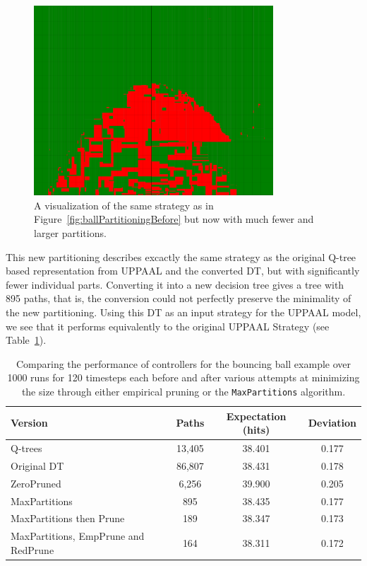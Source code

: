 \documentclass{article}
\begin{document}
\begin{figure}[h]
    \centering
    \includegraphics[width=0.8\textwidth]{ballPartitioningAfter}
    \caption{%
        A visualization of the same strategy as in
        Figure~\ref{fig:ballPartitioningBefore} but now with much fewer and
        larger partitions.
    }\label{fig:ballPartitioningAfter}
\end{figure}

This new partitioning describes excactly the same strategy as the original
Q-tree based representation from UPPAAL and the converted DT, but with
significantly fewer individual parts. Converting it into a new decision tree
gives a tree with 895 paths, that is, the conversion could not perfectly
preserve the minimality of the new partitioning. Using this DT as an input
strategy for the UPPAAL model, we see that it performs equivalently to the
original UPPAAL Strategy (see Table~\ref{tab:minimizedResults}).

\begin{table}[h!]
    \centering
    \caption{%
        Comparing the performance of controllers for the bouncing ball example
        over 1000 runs for 120 timesteps each before and after various attempts
        at minimizing the size through either empirical pruning or the
        \texttt{MaxPartitions} algorithm.
    }\label{tab:minimizedResults}
    \begin{tabular}[t]{lccc}
        \toprule
        Version & Paths & Expectation (hits) & Deviation \\
        \midrule
        Q-trees & 13,405 & 38.401 & 0.177 \\
        Original DT & 86,807 & 38.431 & 0.178 \\
        ZeroPruned & 6,256 & 39.900 & 0.205 \\
        MaxPartitions & 895 & 38.435 & 0.177 \\
        MaxPartitions then Prune & 189 & 38.347 & 0.173 \\
        MaxPartitions, EmpPrune and RedPrune & 164 & 38.311 & 0.172 \\
        \bottomrule
    \end{tabular}
\end{table}
\end{document}
